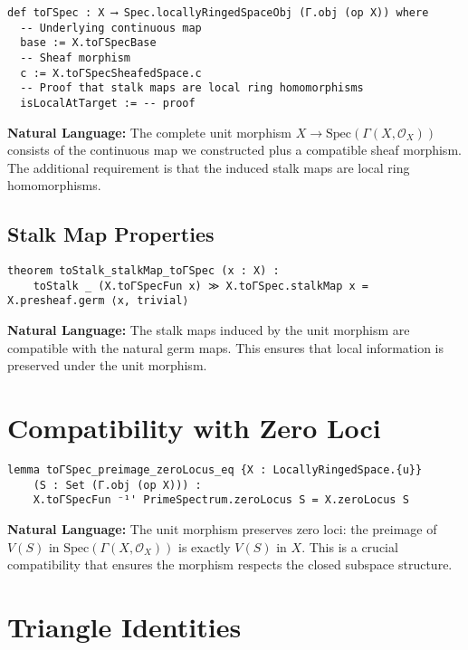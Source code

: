 \documentclass{article}
\theoremstyle{definition}
\begin{document}
\begin{lstlisting}
def toΓSpec : X ⟶ Spec.locallyRingedSpaceObj (Γ.obj (op X)) where
  -- Underlying continuous map
  base := X.toΓSpecBase
  -- Sheaf morphism  
  c := X.toΓSpecSheafedSpace.c
  -- Proof that stalk maps are local ring homomorphisms
  isLocalAtTarget := -- proof
\end{lstlisting}

\textbf{Natural Language:} The complete unit morphism $X \to \mathrm{Spec}(\Gamma(X, \mathcal{O}_X))$ consists of the continuous map we constructed plus a compatible sheaf morphism. The additional requirement is that the induced stalk maps are local ring homomorphisms.

\subsection{Stalk Map Properties}

\begin{lstlisting}
theorem toStalk_stalkMap_toΓSpec (x : X) :
    toStalk _ (X.toΓSpecFun x) ≫ X.toΓSpec.stalkMap x = X.presheaf.germ ⟨x, trivial⟩
\end{lstlisting}

\textbf{Natural Language:} The stalk maps induced by the unit morphism are compatible with the natural germ maps. This ensures that local information is preserved under the unit morphism.

\section{Compatibility with Zero Loci}

\begin{lstlisting}
lemma toΓSpec_preimage_zeroLocus_eq {X : LocallyRingedSpace.{u}}
    (S : Set (Γ.obj (op X))) :
    X.toΓSpecFun ⁻¹' PrimeSpectrum.zeroLocus S = X.zeroLocus S
\end{lstlisting}

\textbf{Natural Language:} The unit morphism preserves zero loci: the preimage of $V(S)$ in $\mathrm{Spec}(\Gamma(X, \mathcal{O}_X))$ is exactly $V(S)$ in $X$. This is a crucial compatibility that ensures the morphism respects the closed subspace structure.

\section{Triangle Identities}
\end{document}
